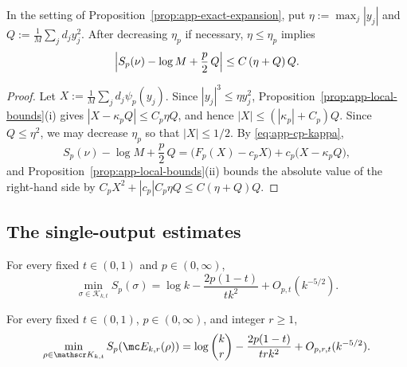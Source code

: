 \begin{proposition}
\label{prop:app-uniform-expansion}
In the setting of Proposition~\ref{prop:app-exact-expansion}, put
\(\eta:=\max_j|y_j|\) and \(Q:=\frac1M\sum_jd_jy_j^2\).  After decreasing
\(\eta_p\) if necessary, \(\eta\le\eta_p\) implies
\begin{equation}
    \Bigl|S_p(\nu)-\log M+\frac p2\,Q\Bigr|\le C\,(\eta+Q)\,Q.
    \label{eq:app-uniform-expansion}
\end{equation}
\end{proposition}
 
\begin{proof}
Let \(X:=\frac1M\sum_jd_j\psi_p(y_j)\).  Since \(|y_j|^3\le\eta y_j^2\),
Proposition~\ref{prop:app-local-bounds}(i) gives
\(|X-\kappa_pQ|\le C_p\eta Q\), and hence \(|X|\le(|\kappa_p|+C_p)Q\).  Since \(Q\le\eta^2\), we may decrease
\(\eta_p\) so that \(|X|\le1/2\).  By \eqref{eq:app-cp-kappa},
\begin{equation}
    S_p(\nu)-\log M+\frac p2\,Q
    =\bigl(F_p(X)-c_pX\bigr)+c_p\bigl(X-\kappa_pQ\bigr),
\end{equation}
and Proposition~\ref{prop:app-local-bounds}(ii) bounds the absolute
value of the right-hand side by \(C_pX^2+|c_p|C_p\eta Q\le C(\eta+Q)Q\).
\end{proof}
 
\subsection{The single-output estimates}
 
\begin{proposition}
\label{prop:app-single-entropy-asymptotics}
For every fixed \(t\in(0,1)\) and \(p\in(0,\infty)\),
\begin{equation}
    \min_{\sigma\in\mathscr K_{k,t}}S_p(\sigma)
    =\log k-\frac{2p(1-t)}{tk^2}+O_{p,t}(k^{-5/2}).
    \label{eq:app-single-entropy-asymptotics}
\end{equation}
\end{proposition}
 
\begin{proposition}
\label{prop:app-antisymmetric-single-entropy-asymptotics}
For every fixed \(t\in(0,1)\), \(p\in(0,\infty)\), and integer \(r\geq1\),
\begin{equation}
    \min_{\rho\in\mathscr K_{k,t}}
        S_p\!\left(\mc E_{k,r}(\rho)\right)
    =
    \log\binom{k}{r}
    -\frac{2p(1-t)}{tr k^2}
    +O_{p,r,t}(k^{-5/2}).
    \label{eq:app-antisymmetric-single-entropy-asymptotics}
\end{equation}
\end{proposition}
 
